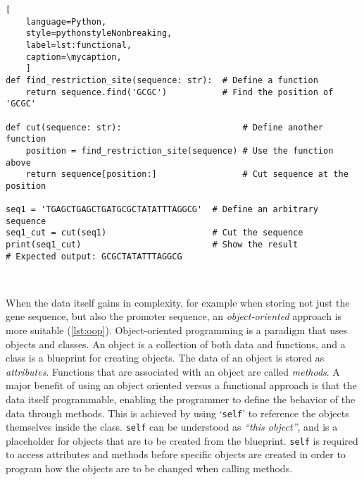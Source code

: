 \def\mycaption{ Example of functional programming in Python. The code
    defines a function called ``\texttt{find\_restriction\_site}'' that
    finds the position of a restriction site in a DNA sequence. The function
    ``\texttt{cut}'' uses the function ``\texttt{find\_restriction\_site}''
    to cut the sequence at the restriction site. To execute both functions,
    we first define an arbitrary DNA sequence and then call the function
    \texttt{cut} passing the sequence as an argument.
}
\begin{lstlisting}[
    language=Python,
    style=pythonstyleNonbreaking,
    label=lst:functional,
    caption=\mycaption,
    ]
def find_restriction_site(sequence: str):  # Define a function
    return sequence.find('GCGC')           # Find the position of 'GCGC'
    
def cut(sequence: str):                        # Define another function
    position = find_restriction_site(sequence) # Use the function above
    return sequence[position:]                 # Cut sequence at the position
    
seq1 = 'TGAGCTGAGCTGATGCGCTATATTTAGGCG'  # Define an arbitrary sequence
seq1_cut = cut(seq1)                     # Cut the sequence
print(seq1_cut)                          # Show the result
# Expected output: GCGCTATATTTAGGCG
    
    
\end{lstlisting}


When the data itself gains in complexity, for example when storing not just the
gene sequence, but also the promoter sequence, an \emph{object-oriented}
approach is more suitable (\autoref{lst:oop}). Object-oriented programming is a
paradigm that uses objects and classes. An object is a collection of
both data and functions, and a class is a blueprint for creating objects. The
data of an object is stored as \emph{attributes}. Functions that are associated
with an object are called \emph{methods}. A major benefit of using an object
oriented versus a functional approach is that the data itself programmable,
enabling the programmer to define the behavior of the data through methods. This
is achieved by using `\texttt{self}' to reference the objects themselves inside
the class. \texttt{self} can be understood as \textit{``this object''}, and is a
placeholder for objects that are to be created from the blueprint. \texttt{self}
is required to access attributes and methods before specific objects are created
in order to program how the objects are to be changed when calling methods.


